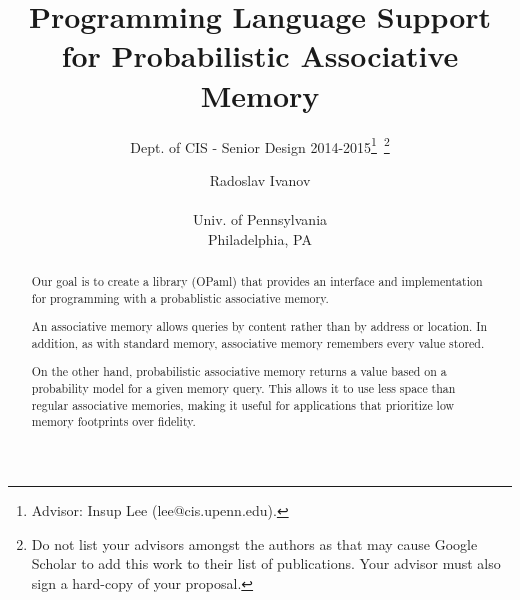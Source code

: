 \documentclass{sig-alternate}
\begin{document}
 

\title{Programming Language Support for Probabilistic Associative Memory}
\subtitle{Dept. of CIS - Senior Design 2014-2015\thanks{Advisor: Insup Lee (lee@cis.upenn.edu).}~\thanks{ Do not list your advisors amongst the authors as that may cause Google Scholar to add this work to their list of publications. Your advisor must also sign a hard-copy of your proposal.}}
\author{
\alignauthor Radoslav Ivanov \\  \\ Univ. of Pennsylvania \\ Philadelphia, PA}
\date{}
\maketitle

\begin{abstract}
    Our goal is to create a library (OPaml) that provides an interface and implementation 
    for programming with a probablistic associative memory. 
    
    An associative memory allows queries by content rather than by address or location.
    In addition, as with standard memory, associative memory remembers every value stored.

    On the other hand, probabilistic associative memory returns a value based on a probability model 
    for a given memory query. This allows it to use less space than regular
    associative memories, making it useful for applications that prioritize low memory footprints over 
    fidelity. 
    
\end{abstract}
\end{document}

